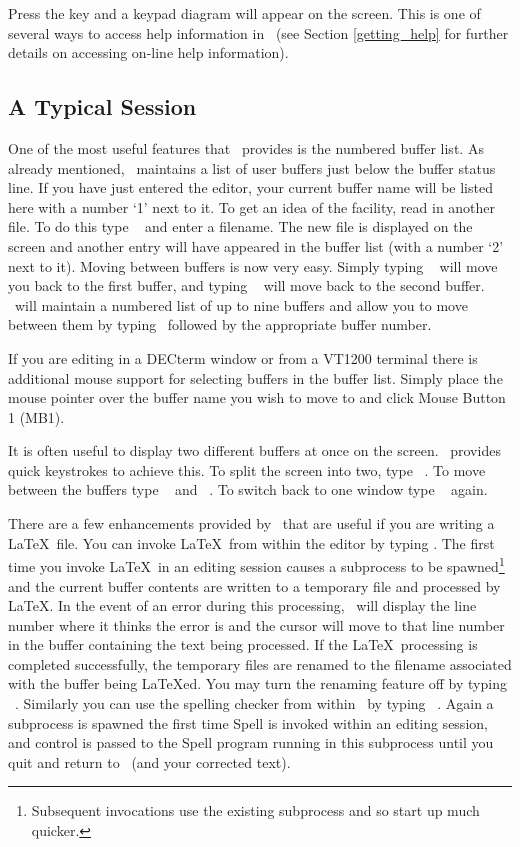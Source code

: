 Press the  key and a keypad diagram will appear on the screen.
This is one of several ways to access help information in \STEve\ (see Section
\ref{getting_help} for further details on accessing on-line help information).

\subsection{A Typical Session}

One of the most useful features that \STEve\ provides is the numbered buffer
list. As already mentioned, \STEve\ maintains a list of user buffers just below
the buffer status line. If you have just entered the editor, your current
buffer name will be listed here with a number `1' next to it. To get an idea of
the facility, read in another file. To do this type \gold\  and
enter a filename. The new file is displayed on the screen and another entry
will have appeared in the buffer list (with a number `2' next to it). Moving
between buffers is now very easy. Simply typing \gold\  will move
you back to the first buffer, and typing \gold\  will move back to
the second buffer. \STEve\ will maintain a numbered list of up to nine buffers
and allow you to move between them by typing \gold\ followed by the appropriate
buffer number.

If you are editing in a DECterm window or from a VT1200 terminal there is
additional mouse support for selecting buffers in the buffer list. Simply place
the mouse pointer over the buffer name you wish to move to and click Mouse
Button 1 (MB1).

It is often useful to display two different buffers at once on the screen.
\STEve\ provides quick keystrokes to achieve this. To split the screen into
two, type \gold\ \keyname{=}. To move between the buffers type \gold\
\keyname{$\bigtriangleup$} and \gold\ \keyname{$\bigtriangledown$}. To switch
back to one window type \gold\ \keyname{=} again.

There are a few enhancements provided by \STEve\ that are useful if you are
writing a \LaTeX\ file. You can invoke \LaTeX\ from within the editor by typing
\keyname{CTRL} \keyname{L}. The first time you invoke \LaTeX\ in an editing
session causes a subprocess to be spawned\footnote{Subsequent invocations use
the existing subprocess and so start up much quicker.}
and the current buffer contents are written to a temporary file
and processed by \LaTeX . In the event of an error during this processing,
\STEve\ will display the line number where it thinks the error is and the
cursor will move to that line number in the buffer containing the text being
processed. If the \LaTeX\ processing is completed successfully, the temporary
files are renamed to the filename associated with the buffer being \LaTeX ed.
You may turn the renaming feature off by typing
\gold\ . Similarly you can use the spelling checker from within
\STEve\ by typing \gold\ \keyname{S}. Again a subprocess is spawned the first
time Spell is invoked within an editing session, and control is passed to the
Spell program running in this subprocess until you quit and return to \STEve\
(and your corrected text).

